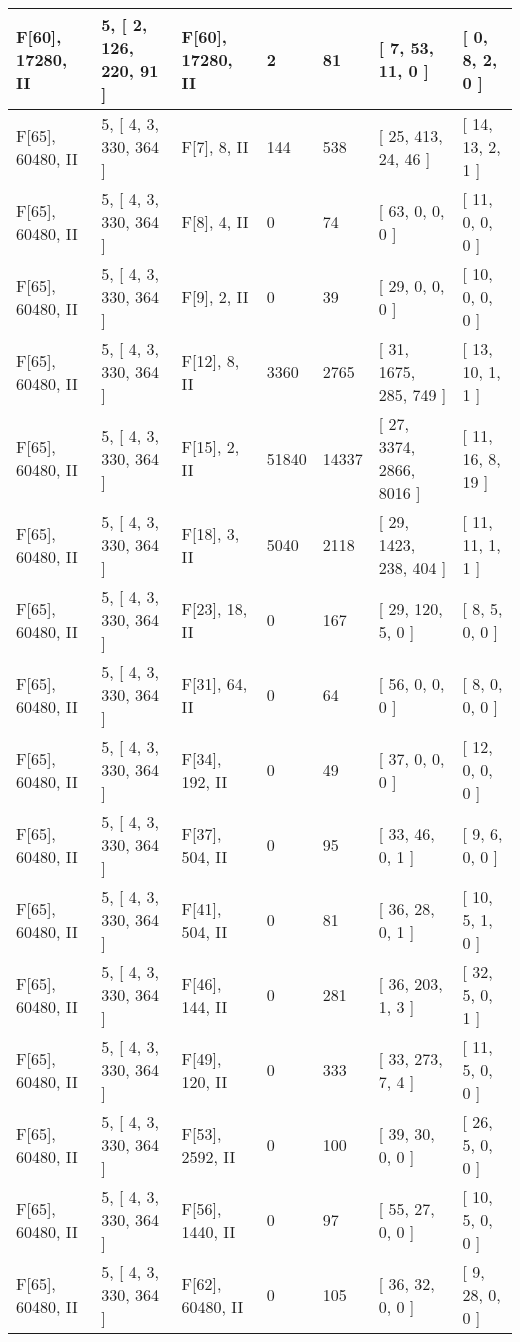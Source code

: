 \documentclass[9 pt]{scrartcl}
\begin{document}
\begin{longtable}{ |p{3em}|p{6em}|p{3em}|p{2em}|p{2em}|p{6em}|p{6em}| }
F[60], 17280, II &5, [ 2, 126, 220, 91 ] & F[60], 17280, II  & 2 & 81 & [ 7, 53, 11, 0 ] & [ 0, 8, 2, 0 ]\\ \hline
F[65], 60480, II &5, [ 4, 3, 330, 364 ] & F[7], 8, II  & 144 & 538 & [ 25, 413, 24, 46 ] & [ 14, 13, 2, 1 ]\\ \hline
F[65], 60480, II &5, [ 4, 3, 330, 364 ] & F[8], 4, II  & 0 & 74 & [ 63, 0, 0, 0 ] & [ 11, 0, 0, 0 ]\\ \hline
F[65], 60480, II &5, [ 4, 3, 330, 364 ] & F[9], 2, II  & 0 & 39 & [ 29, 0, 0, 0 ] & [ 10, 0, 0, 0 ]\\ \hline
F[65], 60480, II &5, [ 4, 3, 330, 364 ] & F[12], 8, II  & 3360 & 2765 & [ 31, 1675, 285, 749 ] & [ 13, 10, 1, 1 ]\\ \hline
F[65], 60480, II &5, [ 4, 3, 330, 364 ] & F[15], 2, II  & 51840 & 14337 & [ 27, 3374, 2866, 8016 ] & [ 11, 16, 8, 19 ]\\ \hline
F[65], 60480, II &5, [ 4, 3, 330, 364 ] & F[18], 3, II  & 5040 & 2118 & [ 29, 1423, 238, 404 ] & [ 11, 11, 1, 1 ]\\ \hline
F[65], 60480, II &5, [ 4, 3, 330, 364 ] & F[23], 18, II  & 0 & 167 & [ 29, 120, 5, 0 ] & [ 8, 5, 0, 0 ]\\ \hline
F[65], 60480, II &5, [ 4, 3, 330, 364 ] & F[31], 64, II  & 0 & 64 & [ 56, 0, 0, 0 ] & [ 8, 0, 0, 0 ]\\ \hline
F[65], 60480, II &5, [ 4, 3, 330, 364 ] & F[34], 192, II  & 0 & 49 & [ 37, 0, 0, 0 ] & [ 12, 0, 0, 0 ]\\ \hline
F[65], 60480, II &5, [ 4, 3, 330, 364 ] & F[37], 504, II  & 0 & 95 & [ 33, 46, 0, 1 ] & [ 9, 6, 0, 0 ]\\ \hline
F[65], 60480, II &5, [ 4, 3, 330, 364 ] & F[41], 504, II  & 0 & 81 & [ 36, 28, 0, 1 ] & [ 10, 5, 1, 0 ]\\ \hline
F[65], 60480, II &5, [ 4, 3, 330, 364 ] & F[46], 144, II  & 0 & 281 & [ 36, 203, 1, 3 ] & [ 32, 5, 0, 1 ]\\ \hline
F[65], 60480, II &5, [ 4, 3, 330, 364 ] & F[49], 120, II  & 0 & 333 & [ 33, 273, 7, 4 ] & [ 11, 5, 0, 0 ]\\ \hline
F[65], 60480, II &5, [ 4, 3, 330, 364 ] & F[53], 2592, II  & 0 & 100 & [ 39, 30, 0, 0 ] & [ 26, 5, 0, 0 ]\\ \hline
F[65], 60480, II &5, [ 4, 3, 330, 364 ] & F[56], 1440, II  & 0 & 97 & [ 55, 27, 0, 0 ] & [ 10, 5, 0, 0 ]\\ \hline
F[65], 60480, II &5, [ 4, 3, 330, 364 ] & F[62], 60480, II  & 0 & 105 & [ 36, 32, 0, 0 ] & [ 9, 28, 0, 0 ]\\ \hline

\end{longtable}
\end{document}
